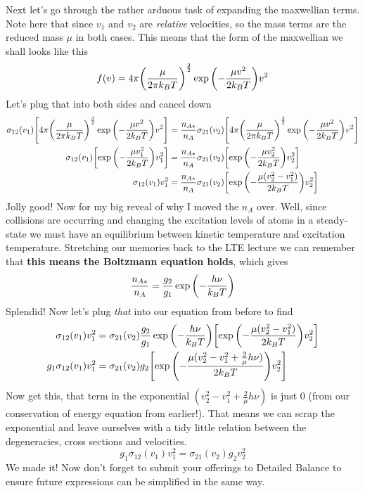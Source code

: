 \documentclass[12pt, letterpaper, twoside]{article}
\begin{document}
{    \noindent Next let's go through the rather arduous task of expanding the maxwellian terms. Note here that since $v_1$ and $v_2$ are \emph{relative} velocities, so the mass terms are the reduced mass $\mu$ in both cases. This means that the form of the maxwellian we shall looks like this
    \begin{equation}
        f(v) = 4 \pi \qty(\frac{\mu}{2 \pi k_B T})^{\frac{3}{2}} \exp\qty(-\frac{\mu v^2}{2 k_B T}) v^2
    \end{equation}
    Let's plug that into both sides and cancel down
    \begin{align}
        \sigma_{12}(v_1) \qty[4 \pi \qty(\frac{\mu}{2 \pi k_B T})^{\frac{3}{2}} \exp\qty(-\frac{\mu v^2}{2 k_B T}) v^2] &= \frac{n_{A*}}{n_A} \sigma_{21}(v_2) \qty[4 \pi \qty(\frac{\mu}{2 \pi k_B T})^{\frac{3}{2}} \exp\qty(-\frac{\mu v^2}{2 k_B T}) v^2] \\
        \sigma_{12}(v_1) \qty[\exp\qty(-\frac{\mu v_1^2}{2 k_B T}) v_1^2] &= \frac{n_{A*}}{n_A} \sigma_{21}(v_2) \qty[\exp\qty(-\frac{\mu v_2^2}{2 k_B T}) v_2^2] \\
        \sigma_{12}(v_1) v_1^2 &= \frac{n_{A*}}{n_A} \sigma_{21}(v_2) \qty[\exp\qty(-\frac{\mu (v_2^2 - v_1^2)}{2 k_B T}) v_2^2]
    \end{align}
    Jolly good! Now for my big reveal of why I moved the $n_A$ over. Well, since collisions are occurring and changing the excitation levels of atoms in a steady-state we must have an equilibrium between kinetic temperature and excitation temperature. Stretching our memories back to the LTE lecture we can remember that \textbf{this means the Boltzmann equation holds}, which gives
    \begin{equation}
        \frac{n_{A*}}{n_A} = \frac{g_2}{g_1} \exp \qty(- \frac{h\nu}{k_B T})
    \end{equation}
    Splendid! Now let's plug \emph{that} into our equation from before to find
    \begin{align}
        \sigma_{12}(v_1) v_1^2 &= \sigma_{21}(v_2) \frac{g_2}{g_1} \exp\qty(-\frac{h \nu}{k_B T}) \qty[\exp\qty(-\frac{\mu (v_2^2 - v_1^2)}{2 k_B T}) v_2^2] \\
        g_1 \sigma_{12}(v_1) v_1^2 &= \sigma_{21}(v_2) g_2 \qty[\exp\qty(-\frac{\mu (v_2^2 - v_1^2 + \frac{2}{\mu} h \nu)}{2 k_B T}) v_2^2]
    \end{align}
    Now get this, that term in the exponential $(v_2^2 - v_1^2 + \frac{2}{\mu} h \nu)$ is just 0 (from our conservation of energy equation from earlier!). That means we can scrap the exponential and leave ourselves with a tidy little relation between the degeneracies, cross sections and velocities.
    \begin{equation}
        \boxed{ g_1 \sigma_{12}(v_1) v_1^2 = \sigma_{21}(v_2) g_2 v_2^2 }
    \end{equation}
    We made it! Now don't forget to submit your offerings to Detailed Balance to ensure future expressions can be simplified in the same way.
}
\end{document}

